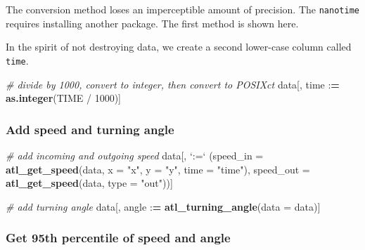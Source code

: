 \documentclass[]{scrartcl}
\newenvironment{Shaded}{}{}
\newcommand{\CommentTok}[1]{\textcolor[rgb]{0.38,0.63,0.69}{\textit{#1}}}
\newcommand{\DataTypeTok}[1]{\textcolor[rgb]{0.56,0.13,0.00}{#1}}
\newcommand{\DecValTok}[1]{\textcolor[rgb]{0.25,0.63,0.44}{#1}}
\newcommand{\ErrorTok}[1]{\textcolor[rgb]{1.00,0.00,0.00}{\textbf{#1}}}
\newcommand{\KeywordTok}[1]{\textcolor[rgb]{0.00,0.44,0.13}{\textbf{#1}}}
\newcommand{\NormalTok}[1]{#1}
\newcommand{\OperatorTok}[1]{\textcolor[rgb]{0.40,0.40,0.40}{#1}}
\newcommand{\StringTok}[1]{\textcolor[rgb]{0.25,0.44,0.63}{#1}}
\begin{document}
The conversion method loses an imperceptible amount of precision. The \texttt{nanotime} requires installing another package. The first method is shown here.

In the spirit of not destroying data, we create a second lower-case column called \texttt{time}.

\begin{Shaded}
\begin{Highlighting}[]
\CommentTok{# divide by 1000, convert to integer, then convert to POSIXct}
\NormalTok{data[, time }\OperatorTok{:}\ErrorTok{=}\StringTok{ }\KeywordTok{as.integer}\NormalTok{(TIME }\OperatorTok{/}\StringTok{ }\DecValTok{1000}\NormalTok{)]}
\end{Highlighting}
\end{Shaded}

\hypertarget{add-speed-and-turning-angle}{%
\subsubsection{Add speed and turning angle}\label{add-speed-and-turning-angle}}

\begin{Shaded}
\begin{Highlighting}[]
\CommentTok{# add incoming and outgoing speed}
\NormalTok{data[, }\StringTok{`}\DataTypeTok{:=}\StringTok{`}\NormalTok{ (}\DataTypeTok{speed_in =} \KeywordTok{atl_get_speed}\NormalTok{(data, }
                                      \DataTypeTok{x =} \StringTok{"x"}\NormalTok{, }
                                      \DataTypeTok{y =} \StringTok{"y"}\NormalTok{, }
                                      \DataTypeTok{time =} \StringTok{"time"}\NormalTok{),}
             \DataTypeTok{speed_out =} \KeywordTok{atl_get_speed}\NormalTok{(data, }\DataTypeTok{type =} \StringTok{"out"}\NormalTok{))]}

\CommentTok{# add turning angle}
\NormalTok{data[, angle }\OperatorTok{:}\ErrorTok{=}\StringTok{ }\KeywordTok{atl_turning_angle}\NormalTok{(}\DataTypeTok{data =}\NormalTok{ data)]}
\end{Highlighting}
\end{Shaded}

\hypertarget{get-95th-percentile-of-speed-and-angle}{%
\subsubsection{Get 95th percentile of speed and angle}\label{get-95th-percentile-of-speed-and-angle}}
\end{document}
